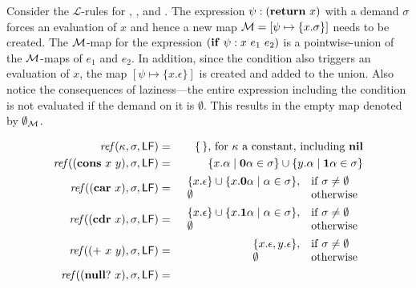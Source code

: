 \documentclass[9pt]{sigplanconf}
\begin{document}
Consider  the $\mathcal{L}$-rules for  {\LET}, {\SIF},  and {\RETURN}.
The  expression $\psi:(\mbox{$\mathbf{ return}$}~x)$  with  a demand  $\sigma$ forces  an
evaluation  of  $x$  and  hence  a  new  map  ${\cal  M}=[\psi  \mapsto
  \{x.\sigma\}] $  needs to  be created.  The  ${\cal M}$-map  for the
expression $(\mbox{$\mathbf{ if}$}~\psi:x~e_1~e_2)$  is a pointwise-union  of the ${\cal
  M}$-maps of $e_1$ and $e_2$.   In addition, since the condition also
triggers an evaluation of  $x$, the map $[\psi \mapsto \{x.\epsilon\}]$
is created and added to  the union.  Also notice the consequences
of  laziness---the entire  expression including  the condition  is not
evaluated if  the demand  on it is  $\emptyset$.  This results  in the
empty map denoted by $\emptyset_{\cal{M}}$.
\begin{figure*}[t]  
\begin{eqnarray*}
\mathit{ref\/}(\kappa,\sigma,\mathsf{LF})
          &=& \{\,\} \mbox{, for $\kappa$ a constant, including $\mbox{$\mathbf{ nil}$}$}\\
\mathit{ref\/}((\mbox{$\mathbf{cons}$}~x~y),\sigma,\mathsf{LF})
          &=& \{x.\alpha \mid \mathbf{0}\alpha \in \sigma\} \cup \{y.\alpha \mid \mathbf{1}\alpha \in \sigma\} \\
\mathit{ref\/}((\mbox{$\mathbf{car}$}~x),\sigma,\mathsf{LF})
          &=&    \begin{array}{l l}
                    \{x.\epsilon\} \cup \{x.\mathbf{0}\alpha \mid \alpha \in
\sigma\}, & \mbox{if}~\sigma \ne \emptyset\\
                    \emptyset  & \mbox{otherwise}
                 \end{array} \\
\mathit{ref\/}((\mbox{$\mathbf{cdr}$}~x),\sigma,\mathsf{LF})
          &=&    \begin{array}{l l}
                    \{x.\epsilon\} \cup \{x.\mathbf{1}\alpha \mid \alpha \in
\sigma\}, & \mbox{if}~\sigma \ne \emptyset\\
                    \emptyset  & \mbox{otherwise}
                 \end{array} \\
\mathit{ref\/}((\mbox{$\mathbf{ +}$}~x~y),\sigma,\mathsf{LF})
          &=&    \begin{array}{l l}
                    \{x.\epsilon, y.\epsilon\},  & \mbox{if}~\sigma \ne \emptyset\\
                    \emptyset  & \mbox{otherwise}
                 \end{array} \\
\mathit{ref\/}((\mbox{$\mathbf{ null?}$}~x),\sigma,\mathsf{LF})
          &=&    \begin{array}{l l}

\end{array}
\end{eqnarray*}
\end{figure*}
\end{document}
